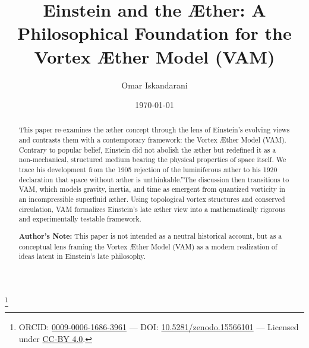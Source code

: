 \documentclass[a4paper,12pt]{revtex4}
\begin{document}
    \date{\today}
    \author{Omar Iskandarani}
    \title{Einstein and the Æther: A Philosophical Foundation for the Vortex Æther Model (VAM)}
    \thanks{ORCID: \href{https://orcid.org/0009-0006-1686-3961}{0009-0006-1686-3961} — \footnotesize DOI: \href{https://doi.org/10.5281/zenodo.15566101}{10.5281/zenodo.15566101}  — Licensed under \href{https://creativecommons.org/licenses/by/4.0/}{CC-BY 4.0}.}


    \begin{abstract}
        This paper re-examines the æther concept through the lens of Einstein's evolving views and contrasts them with a contemporary framework: the Vortex Æther Model (VAM). Contrary to popular belief, Einstein did not abolish the æther but redefined it as a non-mechanical, structured medium bearing the physical properties of space itself. We trace his development from the 1905 rejection of the luminiferous æther to his 1920 declaration that \grqq space without æther is unthinkable.\textquotedblright The discussion then transitions to VAM, which models gravity, inertia, and time as emergent from quantized vorticity in an incompressible superfluid æther. Using topological vortex structures and conserved circulation, VAM formalizes Einstein's late æther view into a mathematically rigorous and experimentally testable framework.

        \textbf{Author's Note:} This paper is not intended as a neutral historical account, but as a conceptual lens framing the Vortex Æther Model (VAM) as a modern realization of ideas latent in Einstein's late philosophy.
    \end{abstract}

    \maketitle

    
    
    

    \appendix \label{sec:Appendix}
        
        
        

    
    
\end{document}
